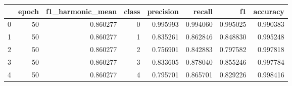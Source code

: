 \begin{tabular}{lrrrrrrr}
\toprule
 & epoch & f1_harmonic_mean & class & precision & recall & f1 & accuracy \\
\midrule
0 & 50 & 0.860277 & 0 & 0.995993 & 0.994060 & 0.995025 & 0.990383 \\
1 & 50 & 0.860277 & 1 & 0.835261 & 0.862846 & 0.848830 & 0.995248 \\
2 & 50 & 0.860277 & 2 & 0.756901 & 0.842883 & 0.797582 & 0.997818 \\
3 & 50 & 0.860277 & 3 & 0.833605 & 0.878040 & 0.855246 & 0.997784 \\
4 & 50 & 0.860277 & 4 & 0.795701 & 0.865701 & 0.829226 & 0.998416 \\
\bottomrule
\end{tabular}

